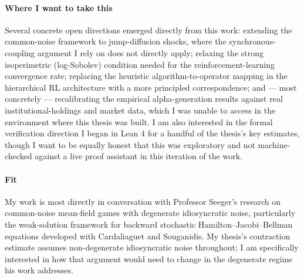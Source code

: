 \documentclass[11pt]{article}
\begin{document}
\paragraph{Where I want to take this} Several concrete open directions emerged directly from this
work: extending the common-noise framework to jump-diffusion shocks, where the
synchronous-coupling argument I rely on does not directly apply; relaxing the strong isoperimetric
(log-Sobolev) condition needed for the reinforcement-learning convergence rate; replacing the
heuristic algorithm-to-operator mapping in the hierarchical RL architecture with a more principled
correspondence; and --- most concretely --- recalibrating the empirical alpha-generation results
against real institutional-holdings and market data, which I was unable to access in the
environment where this thesis was built. I am also interested in the formal verification direction
I began in Lean 4 for a handful of the thesis's key estimates, though I want to be equally honest
that this was exploratory and not machine-checked against a live proof assistant in this iteration
of the work.

\paragraph{Fit} My work is most directly in conversation with Professor Seeger's research on
common-noise mean-field games with degenerate idiosyncratic noise, particularly the weak-solution
framework for backward stochastic Hamilton--Jacobi--Bellman equations developed with Cardaliaguet
and Souganidis. My thesis's contraction estimate assumes non-degenerate idiosyncratic noise
throughout; I am specifically interested in how that argument would need to change in the
degenerate regime his work addresses.
\end{document}
